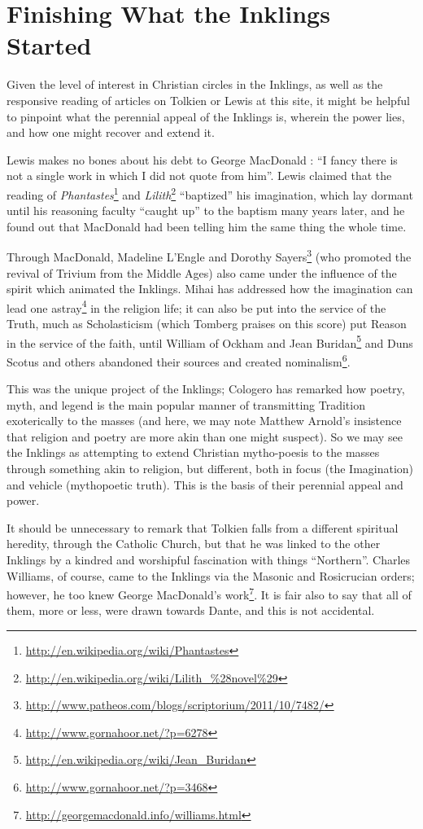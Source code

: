 \section{Finishing What the Inklings Started}

Given the level of interest in Christian circles in the Inklings, as well as the responsive reading of articles on Tolkien or Lewis at this site, it might be helpful to pinpoint what the perennial appeal of the Inklings is, wherein the power lies, and how one might recover and extend it.

Lewis makes no bones about his debt to George MacDonald : ``I fancy there is not a single work in which I did not quote from him''. Lewis claimed that the reading of \textit{Phantastes}\footnote{\url{http://en.wikipedia.org/wiki/Phantastes}} and \textit{Lilith}\footnote{\url{http://en.wikipedia.org/wiki/Lilith_\%28novel\%29}} ``baptized'' his imagination, which lay dormant until his reasoning faculty ``caught up'' to the baptism many years later, and he found out that MacDonald had been telling him the same thing the whole time.

Through MacDonald, Madeline L'Engle and Dorothy Sayers\footnote{\url{http://www.patheos.com/blogs/scriptorium/2011/10/7482/}} (who promoted the revival of Trivium from the Middle Ages) also came under the influence of the spirit which animated the Inklings. Mihai has addressed how the imagination can lead one astray\footnote{\url{http://www.gornahoor.net/?p=6278}} in the religion life; it can also be put into the service of the Truth, much as Scholasticism (which Tomberg praises on this score) put Reason in the service of the faith, until William of Ockham and Jean Buridan\footnote{\url{http://en.wikipedia.org/wiki/Jean_Buridan}} and Duns Scotus and others abandoned their sources and created nominalism\footnote{\url{http://www.gornahoor.net/?p=3468}}.

This was the unique project of the Inklings; Cologero has remarked how poetry, myth, and legend is the main popular manner of transmitting Tradition exoterically to the masses (and here, we may note Matthew Arnold's insistence that religion and poetry are more akin than one might suspect). So we may see the Inklings as attempting to extend Christian mytho-poesis to the masses through something akin to religion, but different, both in focus (the Imagination) and vehicle (mythopoetic truth). This is the basis of their perennial appeal and power.

It should be unnecessary to remark that Tolkien falls from a different spiritual heredity, through the Catholic Church, but that he was linked to the other Inklings by a kindred and worshipful fascination with things ``Northern''. Charles Williams, of course, came to the Inklings via the Masonic and Rosicrucian orders; however, he too knew George MacDonald's work\footnote{\url{http://georgemacdonald.info/williams.html}}. It is fair also to say that all of them, more or less, were drawn towards Dante, and this is not accidental.


